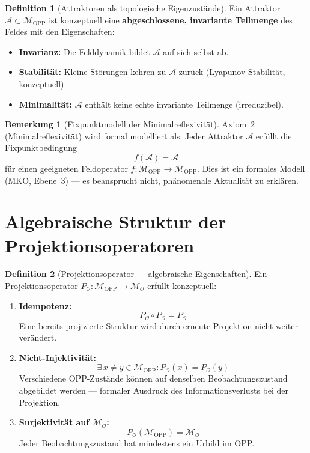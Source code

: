 \documentclass[11pt,a4paper]{article}
\theoremstyle{plain}
\theoremstyle{definition}
\newtheorem{definition}{Definition}[section]
\newtheorem{remark}{Bemerkung}[section]
\begin{document}
\begin{definition}[Attraktoren als topologische Eigenzust\"{a}nde]
Ein Attraktor $\mathcal{A} \subset \mathcal{M}_{\text{OPP}}$ ist konzeptuell eine
\textbf{abgeschlossene, invariante Teilmenge} des Feldes mit den Eigenschaften:
\begin{itemize}
  \item \textbf{Invarianz:} Die Felddynamik bildet $\mathcal{A}$ auf sich selbst ab.
  \item \textbf{Stabilit\"{a}t:} Kleine St\"{o}rungen kehren zu $\mathcal{A}$ zur\"{u}ck
        (Lyapunov-Stabilit\"{a}t, konzeptuell).
  \item \textbf{Minimalit\"{a}t:} $\mathcal{A}$ enth\"{a}lt keine echte invariante
        Teilmenge (irreduzibel).
\end{itemize}
\end{definition}

\begin{remark}[Fixpunktmodell der Minimalreflexivit\"{a}t]
Axiom~2 (Minimalreflexivit\"{a}t) wird formal modelliert als: Jeder Attraktor
$\mathcal{A}$ erf\"{u}llt die Fixpunktbedingung
\[
  f(\mathcal{A}) = \mathcal{A}
\]
f\"{u}r einen geeigneten Feldoperator $f\colon \mathcal{M}_{\text{OPP}} \to
\mathcal{M}_{\text{OPP}}$. Dies ist ein formales Modell (MKO, Ebene~3) --- es
beansprucht nicht, ph\"{a}nomenale Aktualit\"{a}t zu erkl\"{a}ren.
\end{remark}

\section{Algebraische Struktur der Projektionsoperatoren}

\begin{definition}[Projektionsoperator --- algebraische Eigenschaften]
Ein Projektionsoperator $P_{\mathcal{O}}\colon \mathcal{M}_{\text{OPP}} \to
\mathcal{M}_{\mathcal{O}}$ erf\"{u}llt konzeptuell:
\begin{enumerate}
  \item \textbf{Idempotenz:}
        \[ P_{\mathcal{O}} \circ P_{\mathcal{O}} = P_{\mathcal{O}} \]
        Eine bereits projizierte Struktur wird durch erneute Projektion nicht
        weiter ver\"{a}ndert.
  \item \textbf{Nicht-Injektivit\"{a}t:}
        \[ \exists\, x \neq y \in \mathcal{M}_{\text{OPP}}\colon
           P_{\mathcal{O}}(x) = P_{\mathcal{O}}(y) \]
        Verschiedene OPP-Zust\"{a}nde k\"{o}nnen auf denselben Beobachtungszustand
        abgebildet werden --- formaler Ausdruck des Informationsverlusts bei der
        Projektion.
  \item \textbf{Surjektivit\"{a}t auf $\mathcal{M}_{\mathcal{O}}$:}
        \[ P_{\mathcal{O}}(\mathcal{M}_{\text{OPP}}) = \mathcal{M}_{\mathcal{O}} \]
        Jeder Beobachtungszustand hat mindestens ein Urbild im OPP.
\end{enumerate}
\end{definition}
\end{document}
